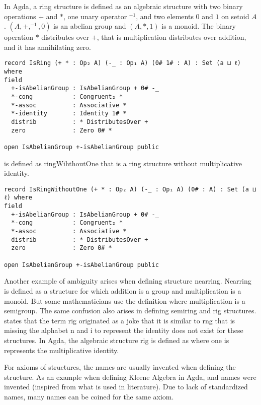 In Agda, a ring structure is defined as an algebraic structure with two binary
operations $+$ and $*$, one unary operator $^{-1}$, and two elements $0$ and $1$
on setoid $A$. $(A,+,^{-1},0)$ is an abelian group and $(A,*,1)$ is a monoid.
The binary operation $*$ distributes over $+$, that is multiplication
distributes over addition, and it has annihilating zero.

\begin{verbatim}
record IsRing (+ * : Op₂ A) (-_ : Op₁ A) (0# 1# : A) : Set (a ⊔ ℓ) where
field
  +-isAbelianGroup : IsAbelianGroup + 0# -_
  *-cong           : Congruent₂ *
  *-assoc          : Associative *
  *-identity       : Identity 1# *
  distrib          : * DistributesOver +
  zero             : Zero 0# *

open IsAbelianGroup +-isAbelianGroup public
\end{verbatim} 
 is defined as ringWihthoutOne that is a ring structure without
multiplicative identity.
\begin{verbatim}
record IsRingWithoutOne (+ * : Op₂ A) (-_ : Op₁ A) (0# : A) : Set (a ⊔ ℓ) where
field
  +-isAbelianGroup : IsAbelianGroup + 0# -_
  *-cong           : Congruent₂ *
  *-assoc          : Associative *
  distrib          : * DistributesOver +
  zero             : Zero 0# *

open IsAbelianGroup +-isAbelianGroup public
\end{verbatim}

Another example of ambiguity arises when defining structure nearring. Nearring
is defined as a structure for which addition is a group and multiplication is a
monoid. But some mathematicians use the definition where multiplication is a
semigroup. The same confusion also arises in defining semiring and rig
structures. \cite{enwiki:1133737666} states that the term rig originated as a
joke that it is similar to rng that is missing the alphabet n and i to represent
the identity does not exist for these structures. In Agda, the algebraic
structure rig is defined as  where one is represents the
multiplicative identity.

For axioms of structures, the names are usually invented when defining the
structure. As an example when defining Kleene Algebra in Agda,
 and  names were invented
(inspired from what is used in literature). Due to lack of standardized names,
many names can be coined for the same axiom.

